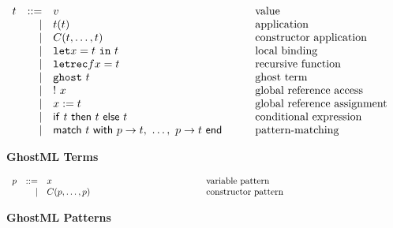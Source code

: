 \documentclass[a4paper,11pt,oneside]{article}
\begin{document}
\begin{small}
\begin{figure}[!h]
\begin{displaymath}
\begin{array}{rrl@{\quad\quad\quad}l}
   t & ::=  & v &																											\text{value} \\
      &   | & t (t) &			 																		                  \text{application} \\
      &   | & C(t,\dots, t) & 																						\text{constructor application  }  \\
      &   | & \texttt{let} x = t \ \texttt{in} \ t	&													\text{local binding} \\
      &   | & \texttt{letrec} f x  = t & 																		\text{recursive function} \\
      &   | & \texttt{ghost} \ t &																				\text{ghost term} \\
      &   | & !~x & 																										\text{global reference access} \\
      &   | & x := t & 																									\text{global reference assignment} \\
      &   | & \mathsf{if}~t~\mathsf{then}~t~\mathsf{else}~t & 						\text{conditional expression} \\
      &   | & \mathsf{match} ~ t ~ \mathsf{with} ~
         p \rightarrow t, ~\dots,~p \rightarrow t  ~ \mathsf{end}& 				    \text{pattern-matching} \\
  \end{array} 
\end{displaymath} \vspace*{-0.5cm}
\caption*{ \textbf{GhostML Terms} \hfill}
\end{figure}
\label{GhostML  patterns}
\begin{figure}[!h]
\begin{displaymath}
  \begin{array}{rrl@{\hspace*{4.5cm}}l}
    p & ::= & x 			&								\text{variable pattern} \hspace*{5cm} \\
      &   | & C(p,\dots,p)	 &						\text{constructor pattern} \\
  \end{array} 
\end{displaymath} \vspace*{-0.5cm}
\caption*{ \textbf{GhostML Patterns} \hfill}
\end{figure}
\end{small}


\label{GhostML operational semantics ------------------}





\end{document}
